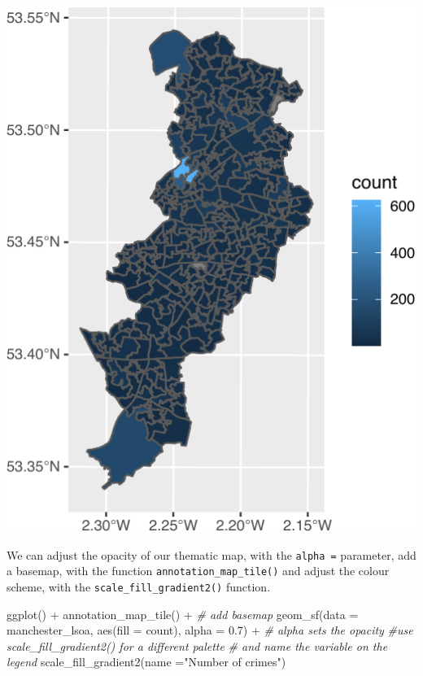 \documentclass[
  krantz2]{krantz}
\makeatletter
\newenvironment{Shaded}{\begin{snugshade}}{\end{snugshade}}
\newcommand{\AttributeTok}[1]{\textcolor[rgb]{0.61,0.61,0.61}{#1}}
\newcommand{\CommentTok}[1]{\textcolor[rgb]{0.37,0.37,0.37}{\textit{#1}}}
\newcommand{\FloatTok}[1]{\textcolor[rgb]{0.06,0.06,0.06}{#1}}
\newcommand{\FunctionTok}[1]{\textcolor[rgb]{0,0,0}{#1}}
\newcommand{\NormalTok}[1]{#1}
\newcommand{\SpecialCharTok}[1]{\textcolor[rgb]{0,0,0}{#1}}
\newcommand{\StringTok}[1]{\textcolor[rgb]{0.5,0.5,0.5}{#1}}
\newenvironment{kframe}{%
\medskip{}
\setlength{\fboxsep}{.8em}
 \def\at@end@of@kframe{}%
 \ifinner\ifhmode%
  \def\at@end@of@kframe{\end{minipage}}%
  \begin{minipage}{\columnwidth}%
 \fi\fi%
 \def\FrameCommand##1{\hskip\@totalleftmargin \hskip-\fboxsep
 \colorbox{shadecolor}{##1}\hskip-\fboxsep
     \hskip-\linewidth \hskip-\@totalleftmargin \hskip\columnwidth}%
 \MakeFramed {\advance\hsize-\width
   \@totalleftmargin\z@ \linewidth\hsize
   \@setminipage}}%
 {\par\unskip\endMakeFramed%
 \at@end@of@kframe}
\renewenvironment{Shaded}{\begin{kframe}}{\end{kframe}}
\makeatother
\begin{document}
\includegraphics{crime_mapping_files/figure-latex/unnamed-chunk-30-1.pdf}

We can adjust the opacity of our thematic map, with the \texttt{alpha\ =} parameter, add a basemap, with the function \texttt{annotation\_map\_tile()} and adjust the colour scheme, with the \texttt{scale\_fill\_gradient2()} function.

\begin{Shaded}
\begin{Highlighting}[]
\FunctionTok{ggplot}\NormalTok{() }\SpecialCharTok{+} 
  \FunctionTok{annotation\_map\_tile}\NormalTok{() }\SpecialCharTok{+}  \CommentTok{\# add basemap}
\FunctionTok{geom\_sf}\NormalTok{(}\AttributeTok{data =}\NormalTok{ manchester\_lsoa, }
        \FunctionTok{aes}\NormalTok{(}\AttributeTok{fill =}\NormalTok{ count), }
        \AttributeTok{alpha =} \FloatTok{0.7}\NormalTok{) }\SpecialCharTok{+} \CommentTok{\# alpha sets the opacity}
  \CommentTok{\#use scale\_fill\_gradient2() for a different palette }
  \CommentTok{\# and name the variable on the legend}
  \FunctionTok{scale\_fill\_gradient2}\NormalTok{(}\AttributeTok{name =}\StringTok{"Number of crimes"}\NormalTok{) }
\end{Highlighting}
\end{Shaded}
\end{document}
